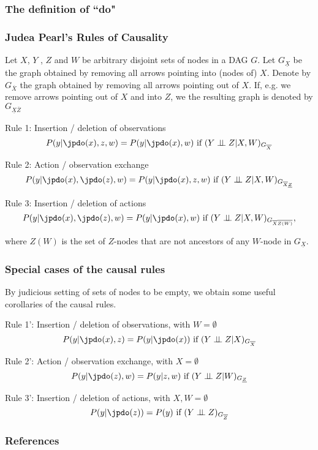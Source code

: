 \begin{frame}
    \frametitle{The definition of ``do"}
\end{frame}
\begin{frame}
\frametitle{Judea Pearl's Rules of Causality}

Let $X$, $Y$ , $Z$ and $W$ be arbitrary disjoint sets of nodes in a DAG $G$. Let $G_\underline{X}$ be the graph obtained by removing all arrows pointing into (nodes of) $X$. 
Denote by $G_{\overline{X}}$ the graph obtained by removing all arrows pointing out of $X$. If, e.g. we remove arrows pointing out of $X$ and into $Z$, we the resulting graph is denoted by $G_{\underline{X} \overline{Z}}$

Rule 1: Insertion / deletion of observations
\begin{equation*}
P(y | \jpdo(x), z, w) = P(y | \jpdo(x), w) \textrm{ if } (Y \ci Z | X, W)_{G_{\overline{X}}}
\end{equation*}

Rule 2: Action / observation exchange
\begin{equation*}
P(y | \jpdo(x), \jpdo(z), w) = P(y | \jpdo(x), z, w) \textrm{ if } (Y \ci Z | X, W)_{G_{\overline{X} \underline{Z}}}
\end{equation*}

Rule 3: Insertion / deletion of actions
\begin{equation*}
P(y | \jpdo(x), \jpdo(z), w) = P(y | \jpdo(x), w) \textrm{ if } (Y \ci Z | X, W)_{G_{\overline{X} \overline{Z(W)}}},
\end{equation*}

where $Z(W)$ is the set of $Z$-nodes that are not ancestors of any $W$-node in $G_\underline{X}$.

\end{frame}

\begin{frame}
\frametitle{Special cases of the causal rules}

By judicious setting of sets of nodes to be empty, we obtain some useful corollaries of the causal rules.
\newline

Rule 1': Insertion / deletion of observations, with $W = \emptyset$
\begin{equation*}
    P(y | \jpdo(x), z) = P(y | \jpdo(x)) \textrm{ if } (Y \ci Z | X)_{G_{\overline{X}}}
\end{equation*}

Rule 2': Action / observation exchange, with $X = \emptyset$
\begin{equation*}
P(y | \jpdo(z), w) = P(y | z, w) \textrm{ if } (Y \ci Z | W)_{G_{ \underline{Z}}}
\end{equation*}

Rule 3': Insertion / deletion of actions, with $X, W = \emptyset$
\begin{equation*}
P(y | \jpdo(z)) = P(y) \textrm{ if } (Y \ci Z )_{G_{\overline{Z}}}
\end{equation*}

\end{frame}

\begin{frame}[allowframebreaks]
    \frametitle{References}
    
    
\end{frame}

